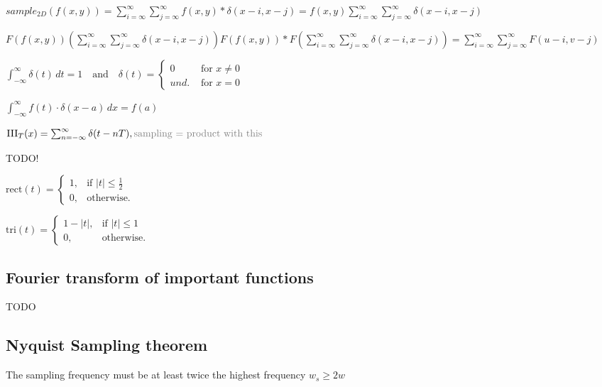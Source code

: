 
$sample_{2D} (f(x, y)) = \sum_{i = \infty}^{\infty} \sum_{j = \infty}^{\infty} f(x, y) * \delta(x - i, x - j) = f(x, y) \sum_{i = \infty}^{\infty}\sum_{j = \infty}^{\infty}\delta(x - i, x - j)$


$ F(f(x, y))  (\sum_{i = \infty}^{\infty}\sum_{j = \infty}^{\infty}\delta(x - i, x - j)) F(f(x, y)) * F( \sum_{i = \infty}^{\infty}\sum_{j = \infty}^{\infty}\delta(x - i, x - j)) =  \sum_{i = \infty}^{\infty}\sum_{j = \infty}^{\infty} F(u - i, v - j)$


$\int_{-\infty}^{\infty} \delta(t) \, dt = 1 \quad \text{and} \quad \delta(t) =  \begin{cases} 0 & \text{ for } x \neq 0 \\ und. & \text{ for } x = 0 \end{cases}$


\color{black} 
$\int_{-\infty}^{\infty} f(t) \cdot \delta(x - a) \, dx = f(a)$


$\text{III}_T(x) = \sum_{n=-\infty}^{\infty} \delta(t - nT),\\ \color{gray} \text{sampling = product with this}$

TODO!

$\text{rect}(t) = \begin{cases} 1, & \text{if } |t| \leq \frac{1}{2} \\ 0, & \text{otherwise.} \end{cases}$

$\text{tri}(t) = \begin{cases} 1 - |t|, & \text{if } |t| \leq 1 \\ 0, & \text{otherwise.} \end{cases}$

\subsection*{Fourier transform of important functions}
TODO

\subsection*{Nyquist Sampling theorem}
The sampling frequency must be at least twice the highest frequency $w_s \geq 2 w$ 

